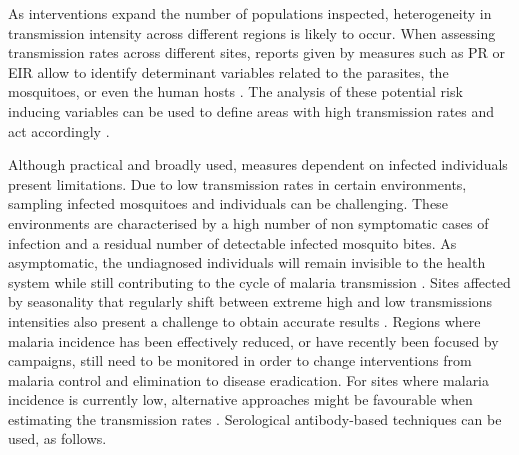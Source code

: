 As interventions expand the number of populations inspected, heterogeneity in transmission intensity across different regions is likely to occur.
When assessing transmission rates across different sites, reports given by measures such as PR or EIR allow to identify determinant variables related to the parasites, the mosquitoes, or even the human hosts \cite{who2015guidelines}.
The analysis of these potential risk inducing variables can be used to define areas with high transmission rates and act accordingly \cite{who2015guidelines,world2015global}.

Although practical and broadly used, measures dependent on infected individuals present limitations.
Due to low transmission rates in certain environments, sampling infected mosquitoes and individuals can be challenging.
These environments are characterised by a high number of non symptomatic cases of infection and a residual number of detectable infected mosquito bites.
As asymptomatic, the undiagnosed individuals will remain invisible to the health system while still contributing to the cycle of malaria transmission \cite{world2015global}.
Sites affected by seasonality that regularly shift between extreme high and low transmissions intensities also present a challenge to obtain accurate results \cite{cameron2015defining,o2007parasite}.
Regions where malaria incidence has been effectively reduced, or have recently been focused by campaigns, still need to be monitored in order to change interventions from malaria control and elimination to disease eradication.
For sites where malaria incidence is currently low, alternative approaches might be favourable when estimating the transmission rates \cite{corran2007serology}.
Serological antibody-based techniques can be used, as follows.
